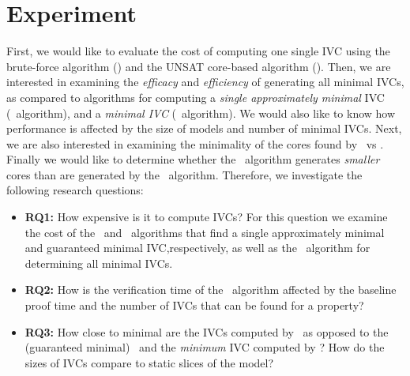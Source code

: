 \section{Experiment}
\label{sec:experiment}

First, we would like to evaluate the cost of computing one single IVC using the brute-force
algorithm (\ucbfalg) and the UNSAT core-based algorithm (\ucalg).
Then, we are interested in examining the {\em efficacy} and {\em efficiency} of generating all minimal IVCs, as compared to algorithms for computing a {\em single approximately minimal} IVC (\ucalg\ algorithm), and a {\em minimal IVC} (\ucbfalg\ algorithm).  We would also like to know how performance is affected by the size of models and number of minimal IVCs.  Next, we are also interested in examining the minimality of the cores found by \ucbfalg\ vs  \ucalg . Finally we would like to determine whether the \aivcalg\ algorithm generates {\em smaller} cores than are generated by the \ucbfalg\ algorithm.  %
%
%
Therefore, we investigate the following research questions:
\begin{itemize}
  \item \textbf{RQ1:} How expensive is it to compute IVCs?  For this question we examine the cost of the \ucalg ~and \ucbfalg ~algorithms that find a single approximately minimal and guaranteed minimal IVC,respectively, as well as the \aivcalg ~algorithm for determining all minimal IVCs.
  \item \textbf{RQ2:} How is the verification time of the \aivcalg ~algorithm affected by the baseline proof time and the number of IVCs that can be found for a property?
   \item \textbf{RQ3:} How close to minimal are the IVCs computed by \ucalg\ as opposed to the (guaranteed minimal) \ucbfalg\ and the \emph{minimum} IVC computed by \aivcalg ?  How do the sizes of IVCs compare to static slices of the model?
%
\end{itemize}


